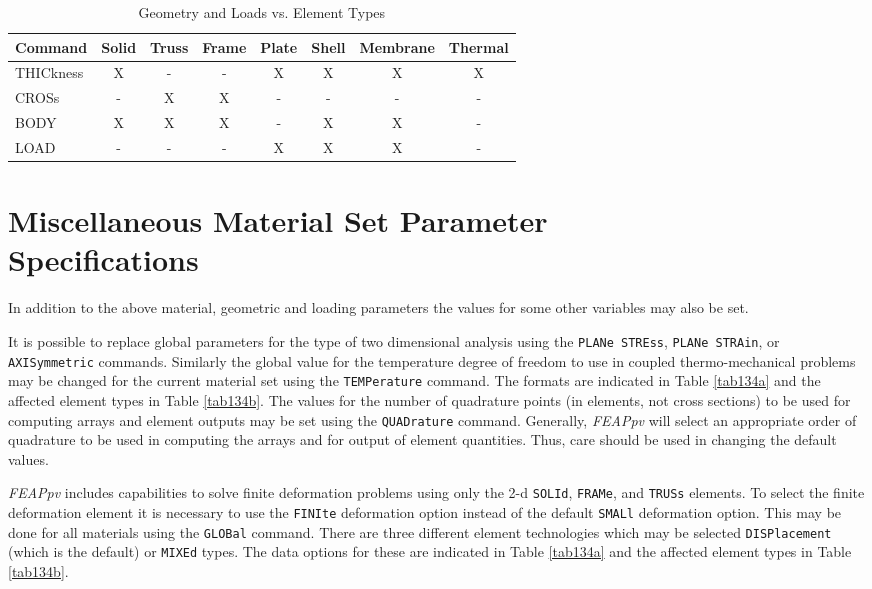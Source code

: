 \begin{table}[ht!]
\begin{center}
\begin{tabular}{| l | c | c | c | c | c | c | c |} \hline
Command & Solid & Truss & Frame & Plate & Shell & Membrane & Thermal \\ \hline
THICkness     & X & - & - & X & X & X & X \\
CROSs         & - & X & X & - & - & - & - \\ \hline
BODY          & X & X & X & - & X & X & - \\
LOAD          & - & - & - & X & X & X & - \\ \hline
\end{tabular}
\end{center}
\caption{Geometry and Loads vs. Element Types}
\label{tab133b}
\end{table}

\section{Miscellaneous Material Set Parameter \\ Specifications}
\label{miscmat}

In addition to the above material, geometric and loading parameters the
values for some other variables may also be set.

It is possible to replace global parameters for the type of two dimensional
analysis using the {\tt PLANe STREss}, {\tt PLANe STRAin}, or {\tt AXISymmetric}
commands.  Similarly the global value for the temperature degree of
freedom to use in coupled thermo-mechanical problems may be changed
for the current material set using the {\tt TEMPerature} command.  The
formats are indicated in Table \ref{tab134a} and the affected element types in
Table \ref{tab134b}.
The values for the number of quadrature points (in elements, not cross sections)
to be used for computing arrays and element
outputs may be set using the {\tt QUADrature} command.
Generally, {\sl FEAPpv} will select an appropriate order of quadrature to
be used in computing the arrays and for output of element quantities.  Thus,
care should be used in changing the default values.

{\sl FEAPpv} includes capabilities to solve finite deformation problems
using only the 2-d {\tt SOLId}, {\tt FRAMe}, and {\tt TRUSs}
elements.  To select the
finite deformation element it is necessary to use the {\tt FINIte} deformation
option instead of the default {\tt SMALl} deformation option.
This may be done for all materials using the {\tt GLOBal} command.
There are three different element technologies
which may be selected {\tt DISPlacement} (which is the default) or {\tt MIXEd}
types. The data options for these are indicated
in Table \ref{tab134a} and the affected element types in Table \ref{tab134b}.

